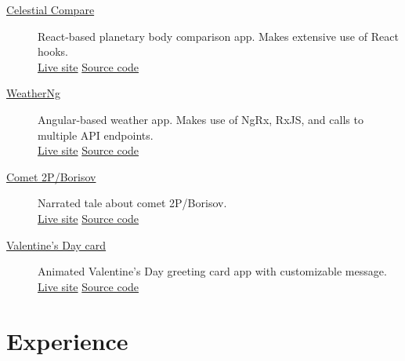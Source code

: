 \documentclass{article}
\begin{document}
\begin{description}
  \item[\href{https://sirkoik.github.io/Celestial-Compare}{Celestial Compare}] React-based planetary body comparison app. Makes extensive use of React hooks.\\ \href{https://sirkoik.github.io/Celestial-Compare}{Live site} \textcolor{gray}{\textbullet} \href{https://github.com/sirkoik/Celestial-Compare}{Source code}
  \item[\href{https://sirkoik.github.io/WeatherNg}{WeatherNg}] Angular-based weather app. Makes use of NgRx, RxJS, and calls to multiple API endpoints.\\ \href{https://sirkoik.github.io/WeatherNg}{Live site} \textcolor{gray}{\textbullet} \href{https://github.com/sirkoik/WeatherNg}{Source code}
  \item[\href{https://sirkoik.github.io/BorisovXmas}{Comet 2P/Borisov}] Narrated tale about comet 2P/Borisov.\\ \href{https://sirkoik.github.io/BorisovXmas}{Live site} \textcolor{gray}{\textbullet} \href{https://github.com/sirkoik/BorisovXmas}{Source code}
  \item[\href{https://sirkoik.github.io/February}{Valentine's Day card}] Animated Valentine's Day greeting card app with customizable message.\\
   \href{https://sirkoik.github.io/February}{Live site} \textcolor{gray}{\textbullet} \href{https://github.com/sirkoik/February}{Source code}
\end{description}

\vspace{-1em}
\section*{Experience}\vspace{-0.5em}
\end{document}
